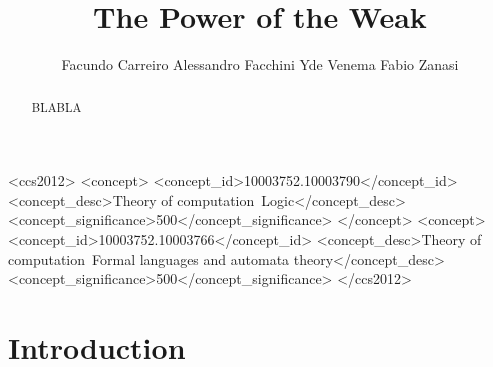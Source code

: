 \documentclass[prodmode,acmtecs]{acmsmall} %
\begin{document}

\title{The Power of the Weak}

\author{
Facundo Carreiro
Alessandro Facchini
Yde Venema
Fabio Zanasi
}

\begin{abstract}
BLABLA
\end{abstract}


%
%
 \begin{CCSXML}
<ccs2012>
<concept>
 <concept_id>10003752.10003790</concept_id>
 <concept_desc>Theory of computation~Logic</concept_desc>
 <concept_significance>500</concept_significance>
 </concept>
 <concept>
 <concept_id>10003752.10003766</concept_id>
 <concept_desc>Theory of computation~Formal languages and automata theory</concept_desc>
 <concept_significance>500</concept_significance>
</ccs2012>
\end{CCSXML}






\maketitle




\section{Introduction}\label{sec:intro}

\end{document}
